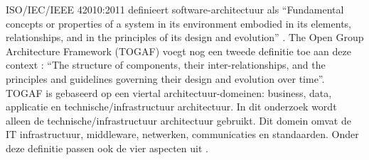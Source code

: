 ISO/IEC/IEEE 42010:2011 definieert software-architectuur als \enquote{Fundamental concepts or properties of a system in its environment embodied in its elements, relationships, and in the principles of its design and evolution} \parencite{IEEEArchitecture}. The Open Group Architecture Framework (TOGAF) voegt nog een tweede definitie toe aan deze context \parencite{ArchitectureTOGAF}: \enquote{The structure of components, their inter-relationships, and the principles and guidelines governing their design and evolution over time}. TOGAF is gebaseerd op een viertal architectuur-domeinen: business, data, applicatie en technische/infrastructuur architectuur. In dit onderzoek wordt alleen de technische/infrastructuur architectuur gebruikt. Dit domein omvat de IT infrastructuur, middleware, netwerken, communicaties en standaarden. Onder deze definitie passen ook de vier aspecten uit \parencite{ArchitectureInPractice}.
